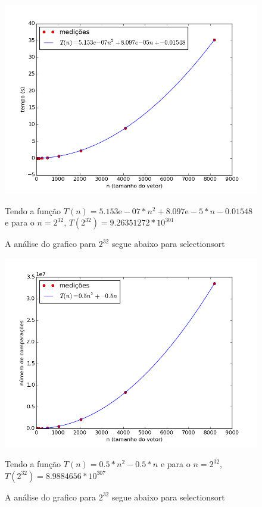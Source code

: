 \documentclass[12pt,a4paper,twoside]{report}
\begin{document}


\begin{figure}[ht]
\centering \includegraphics[scale=0.8]{../selectionsort/imagens/selectionsortQuaseDecresc400.png}
\caption{A análise do grafico para $2^{32}$ segue abaixo para selectionsort}

Tendo a função $T(n) = 5.153\mathrm{e}-07*n^{2}+8.097\mathrm{e}-5*n-0.01548$ e para o $n =2^{32}$, $T(2^{32}) =9.26351272 * 10^{301}$
\label{fig:selectionsortQuaseDecresc400}
\end{figure}

\begin{figure}[ht]
\centering \includegraphics[scale=0.8]{../selectionsort/imagens/selectionsortQuaseDecresc401.png}
\caption{A análise do grafico para $2^{32}$ segue abaixo para selectionsort}

Tendo a função $T(n) = 0.5*n^{2}-0.5*n$ e para o $n =2^{32}$, $T(2^{32}) =8.9884656 * 10^{307}$
\label{fig:selectionsortQuaseDecresc401}
\end{figure}
\end{document}
